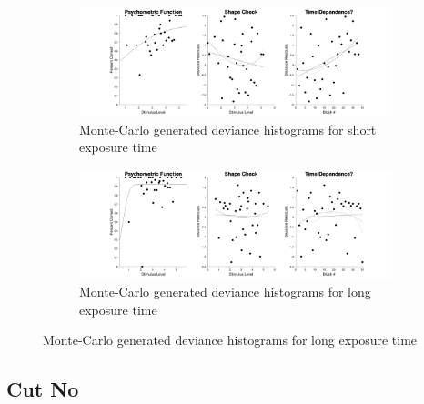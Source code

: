 \documentclass{article}
\begin{document}
\begin{figure}[!hb]
    \begin{subfigure}{\textwidth}
        \centering
        \includegraphics[width = \linewidth]{Thesis/plots/gof/segDist/segDist_js_short_deviance.png}
        \caption{Monte-Carlo generated deviance histograms for short exposure time}
    \end{subfigure}
    \begin{subfigure}{\textwidth}
        \centering
        \includegraphics[width = \linewidth]{Thesis/plots/gof/segDist/segDist_js_long_deviance.png}
        \caption{Monte-Carlo generated deviance histograms for long exposure time}
    \end{subfigure}
\end{figure}

\clearpage

\subsection{Cut No}
\end{document}
